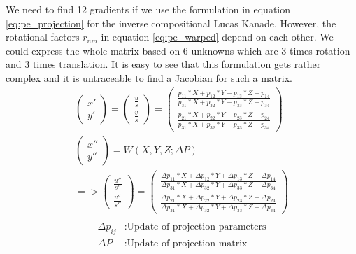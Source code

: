 \documentclass[11pt,a4paper,titlepage,oneside]{report}
\begin{document}
We need to find 12 gradients if we use the formulation in equation \ref{eq:pe_projection} for the inverse compositional Lucas Kanade. However, the rotational factors $r_{nm}$ in equation \ref{eq:pe_warped} depend on each other. We could express the whole matrix based on 6 unknowns which are 3 times rotation and 3 times translation. It is easy to see that this formulation gets rather complex and it is untraceable to find a Jacobian for such a matrix.\\
\begin{equation}\label{eq:pe_projection}
  \begin{gathered}
    \begin{pmatrix}
      x' \\
      y' 
    \end{pmatrix}=
    \begin{pmatrix}
      \frac{u}{s} \\
      \frac{v}{s} 
    \end{pmatrix}=
    \begin{pmatrix}
      \frac{p_{11}*X + p_{12}*Y + p_{13}*Z + p_{14}}{p_{31}*X + p_{32}*Y + p_{33}*Z + p_{34}}  \\
      \frac{p_{21}*X + p_{22}*Y + p_{23}*Z + p_{24}}{p_{31}*X + p_{32}*Y + p_{33}*Z + p_{34}}
    \end{pmatrix}\\
    \begin{pmatrix}
      x'' \\
      y'' 
    \end{pmatrix}=W(X,Y,Z;\Delta P)\\
    =>\begin{pmatrix}
      \frac{u''}{s''} \\
      \frac{v''}{s''} 
    \end{pmatrix}=
    \begin{pmatrix}
      \frac{\Delta p_{11}*X + \Delta p_{12}*Y + \Delta p_{13}*Z + \Delta p_{14}}{\Delta p_{31}*X + \Delta p_{32}*Y + \Delta p_{33}*Z + \Delta p_{34}}  \\
      \frac{\Delta p_{21}*X + \Delta p_{22}*Y + \Delta p_{23}*Z + \Delta p_{24}}{\Delta p_{31}*X + \Delta p_{32}*Y + \Delta p_{33}*Z + \Delta p_{34}}
    \end{pmatrix}\\
  \end{gathered}
\end{equation}
\begin{align*}
  \Delta p_{ij}   &: \text{Update of projection parameters}\\
  \Delta P        &: \text{Update of projection matrix}
\end{align*}
\end{document}
